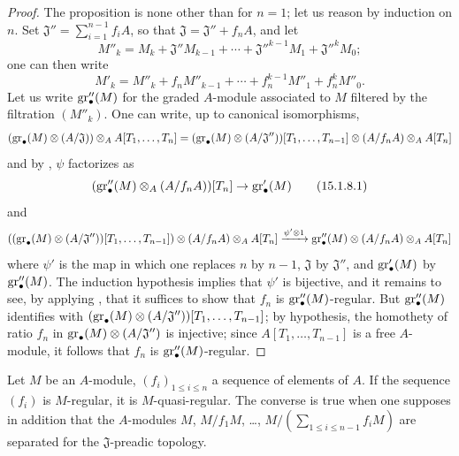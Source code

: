 \begin{proof}
The proposition is none other than  for $n=1$;
let us reason by induction on $n$.
Set $\mathfrak{J}''=\sum_{i=1}^{n-1}f_iA$, so that $\mathfrak{J}=\mathfrak{J}''+f_nA$, and let
\[
  M''_k = M_k+\mathfrak{J}''M_{k-1}+\cdots+\mathfrak{J}''^{k-1}M_1+\mathfrak{J}''^kM_0;
\]
one can then write
\[
  M'_k = M''_k + f_nM''_{k-1}+\cdots+f_n^{k-1}M''_1+f_n^kM''_0.
\]
Let us write $\operatorname{gr}''_\bullet(M)$ for the graded $A$-module associated to $M$ filtered by the filtration $(M''_k)$.
One can write, up to canonical isomorphisms,
\[
  (\operatorname{gr}_\bullet(M)\otimes(A/\mathfrak{J}))\otimes_A A[T_1,\ldots,T_n]
  = (\operatorname{gr}_\bullet(M)\otimes(A/\mathfrak{J}''))[T_1,\ldots,T_{n-1}]\otimes(A/f_nA)\otimes_A A[T_n]
\]
and by , $\psi$ factorizes as
\[
\label{0.15.1.8.1}
  (\operatorname{gr}''_\bullet(M)\otimes_A(A/f_nA))[T_n] \to \operatorname{gr}'_\bullet(M)
\tag{15.1.8.1}
\]
and
\[
  ((\operatorname{gr}_\bullet(M)\otimes(A/\mathfrak{J}''))[T_1,\ldots,T_{n-1}])\otimes(A/f_nA)\otimes_A A[T_n]
  \xrightarrow{\psi'\otimes 1} \operatorname{gr}''_\bullet(M)\otimes(A/f_nA)\otimes_A A[T_n]
\]
where $\psi'$ is the map  in which one replaces $n$ by $n-1$, $\mathfrak{J}$ by $\mathfrak{J}''$, and $\operatorname{gr}'_\bullet(M)$ by $\operatorname{gr}''_\bullet(M)$.
The induction hypothesis implies that $\psi'$ is bijective, and it remains to see, by applying , that it suffices to show that $f_n$ is $\operatorname{gr}''_\bullet(M)$-regular.
But $\operatorname{gr}''_\bullet(M)$ identifies with $(\operatorname{gr}_\bullet(M)\otimes(A/\mathfrak{J}''))[T_1,\ldots,T_{n-1}]$;
by hypothesis, the homothety of ratio $f_n$ in $\operatorname{gr}_\bullet(M)\otimes(A/\mathfrak{J}'')$ is injective;
since $A[T_1,\ldots,T_{n-1}]$ is a free $A$-module, it follows that $f_n$ is $\operatorname{gr}''_\bullet(M)$-regular.
\end{proof}

\begin{proposition}[15.1.9]
\label{0.15.1.9}
Let $M$ be an $A$-module, $(f_i)_{1\leq i\leq n}$ a sequence of elements of $A$.
If the sequence $(f_i)$ is $M$-regular, it is $M$-quasi-regular.
The converse is true when one supposes in addition that the $A$-modules $M$, $M/f_1M$, \ldots, $M/(\sum_{1\leq i\leq n-1}f_iM)$ are separated for the $\mathfrak{J}$-preadic topology.
\end{proposition}

